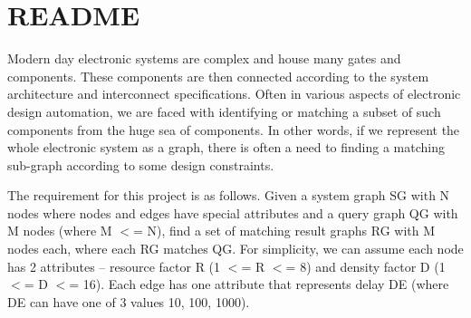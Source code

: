 \chapter{README}
\hypertarget{md__r_e_a_d_m_e}{}\label{md__r_e_a_d_m_e}
Modern day electronic systems are complex and house many gates and components. These components are then connected according to the system architecture and interconnect specifications. Often in various aspects of electronic design automation, we are faced with identifying or matching a subset of such components from the huge sea of components. In other words, if we represent the whole electronic system as a graph, there is often a need to finding a matching sub-\/graph according to some design constraints.

The requirement for this project is as follows. Given a system graph SG with N nodes where nodes and edges have special attributes and a query graph QG with M nodes (where M \texorpdfstring{$<$}{<}= N), find a set of matching result graphs RG with M nodes each, where each RG matches QG. For simplicity, we can assume each node has 2 attributes – resource factor R (1 \texorpdfstring{$<$}{<}= R \texorpdfstring{$<$}{<}= 8) and density factor D (1 \texorpdfstring{$<$}{<}= D \texorpdfstring{$<$}{<}= 16). Each edge has one attribute that represents delay DE (where DE can have one of 3 values 10, 100, 1000). 